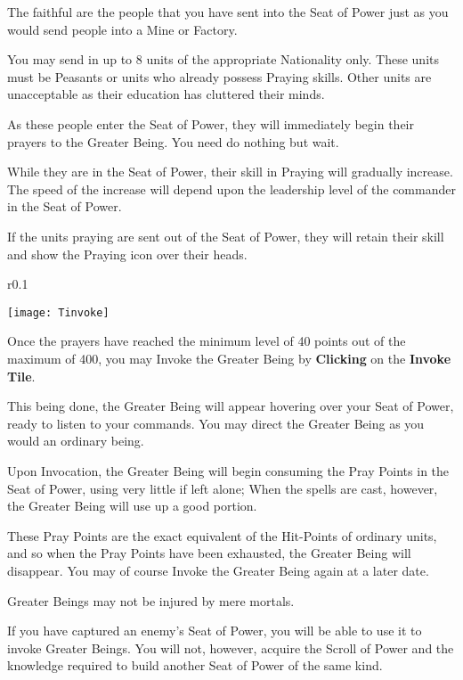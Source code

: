The faithful are the people that you have sent into the Seat of Power just as you would send people into a Mine or Factory.

You may send in up to 8 units of the appropriate Nationality only. These units must be Peasants or units who already possess Praying skills. Other units are unacceptable as their education has cluttered their minds.

As these people enter the Seat of Power, they will immediately begin their prayers to the Greater Being. You need do nothing but wait.

While they are in the Seat of Power, their skill in Praying will gradually increase. The speed of the increase will depend upon the leadership level of the commander in the Seat of Power.

If the units praying are sent out of the Seat of Power, they will retain their skill and show the Praying icon over their heads.

\begin{wrapfigure}{r}{0.1\textwidth}
    \vspace{-20pt}
    \begin{center}
        \texttt{[image: Tinvoke]}
    \end{center}
    \vspace{-20pt}
\end{wrapfigure}

Once the prayers have reached the minimum level of 40 points out of the maximum of 400, you may Invoke the Greater Being by \textbf{Clicking} on the \textbf{Invoke Tile}.

This being done, the Greater Being will appear hovering over your Seat of Power, ready to listen to your commands. You may direct the Greater Being as you would an ordinary being.

Upon Invocation, the Greater Being will begin consuming the Pray Points in the Seat of Power, using very little if left alone; When the spells are cast, however, the Greater Being will use up a good portion.

These Pray Points are the exact equivalent of the Hit-Points of ordinary units, and so when the Pray Points have been exhausted, the Greater Being will disappear. You may of course Invoke the Greater Being again at a later date.

Greater Beings may not be injured by mere mortals.

If you have captured an enemy’s Seat of Power, you will be able to use it to invoke Greater Beings. You will not, however, acquire the Scroll of Power and the knowledge required to build another Seat of Power of the same kind.
